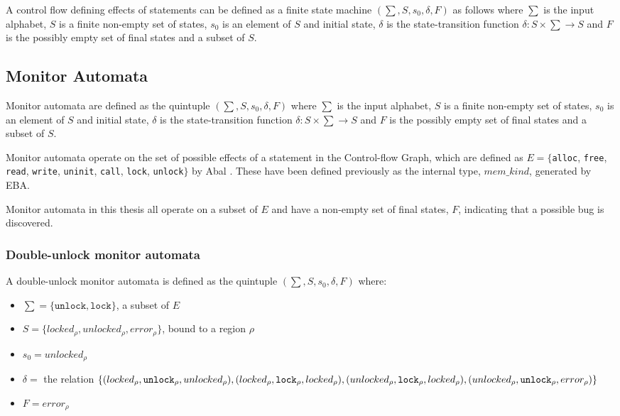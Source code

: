 \newpar A control flow defining effects of statements can be defined as a finite state machine $(\sum, S, s_0, \delta, F)$ as follows where $\sum$ is the input alphabet, $S$ is a finite non-empty set of states, $s_0$ is an element of $S$ and initial state, $\delta$ is the state-transition function $\delta: S \times \sum \rightarrow S$ and $F$ is the possibly empty set of final states and a subset of $S$. 

\subsection{Monitor Automata}
Monitor automata are defined as the quintuple $(\sum, S, s_0, \delta, F)$ where $\sum$ is the input alphabet, $S$ is a finite non-empty set of states, $s_0$ is an element of $S$ and initial state, $\delta$ is the state-transition function $\delta: S \times \sum \rightarrow S$ and $F$ is the possibly empty set of final states and a subset of $S$.

\newpar Monitor automata operate on the set of possible effects of a statement in the Control-flow Graph, which are defined as $E = \{$\texttt{alloc}, \texttt{free}, \texttt{read}, \texttt{write}, \texttt{uninit}, \texttt{call}, \texttt{lock}, \texttt{unlock}$\}$ by Abal \cite{EffectiveBugFinding}. These have been defined previously as the internal type, $mem\_kind$, generated by EBA. 

\newpar Monitor automata in this thesis all operate on a subset of $E$ and have a non-empty set of final states, $F$, indicating that a possible bug is discovered.  

\subsubsection{Double-unlock monitor automata}

A double-unlock monitor automata is defined as the quintuple $(\sum, S, s_0, \delta, F)$ where: 

\begin{itemize}
    \item $\sum = \{\texttt{unlock}, \texttt{lock}\}$, a subset of $E$
    \item $S = \{ locked_\rho, unlocked_\rho, error_\rho \}$, bound to a region $\rho$
    \item $s_0 = unlocked_\rho$ 
    \item $\delta =$ the relation $\{(locked_\rho, \texttt{unlock}_\rho, unlocked_\rho), (locked_\rho, \texttt{lock}_\rho, locked_\rho), \\
        (unlocked_\rho, \texttt{lock}_\rho, locked_\rho), (unlocked_\rho, \texttt{unlock}_\rho, error_\rho)\}$ 
    \item $F = error_\rho$  
\end{itemize}

